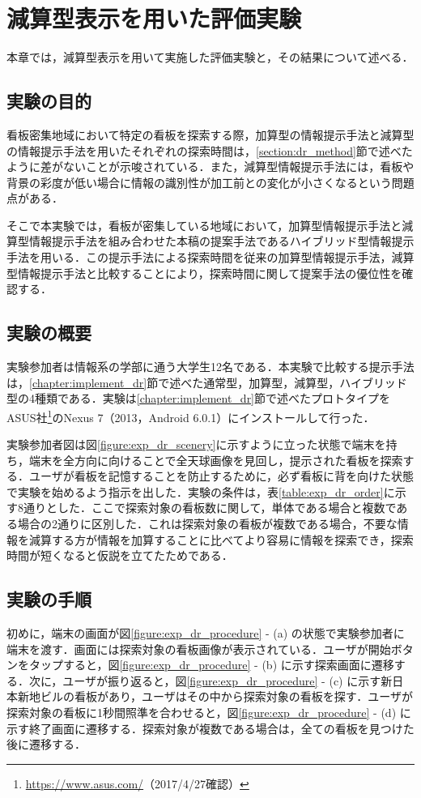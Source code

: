 \chapter{減算型表示を用いた評価実験}
\label{chapter:experiment_dr}
本章では，減算型表示を用いて実施した評価実験と，その結果について述べる．
\section{実験の目的}
  看板密集地域において特定の看板を探索する際，加算型の情報提示手法と減算型の情報提示手法を用いたそれぞれの探索時間は，\ref{section:dr_method}節で述べたように差がないことが示唆されている．また，減算型情報提示手法には，看板や背景の彩度が低い場合に情報の識別性が加工前との変化が小さくなるという問題点がある．

  そこで本実験では，看板が密集している地域において，加算型情報提示手法と減算型情報提示手法を組み合わせた本稿の提案手法であるハイブリッド型情報提示手法を用いる．この提示手法による探索時間を従来の加算型情報提示手法，減算型情報提示手法と比較することにより，探索時間に関して提案手法の優位性を確認する．

\section{実験の概要}
  実験参加者は情報系の学部に通う大学生12名である．本実験で比較する提示手法は，\ref{chapter:implement_dr}節で述べた通常型，加算型，減算型，ハイブリッド型の4種類である．実験は\ref{chapter:implement_dr}節で述べたプロトタイプをASUS社\footnote{\url{https://www.asus.com/}（2017/4/27確認）}のNexus 7（2013，Android 6.0.1）にインストールして行った．

  実験参加者図は図\ref{figure:exp_dr_scenery}に示すように立った状態で端末を持ち，端末を全方向に向けることで全天球画像を見回し，提示された看板を探索する．ユーザが看板を記憶することを防止するために，必ず看板に背を向けた状態で実験を始めるよう指示を出した．実験の条件は，表\ref{table:exp_dr_order}に示す8通りとした．ここで探索対象の看板数に関して，単体である場合と複数である場合の2通りに区別した．これは探索対象の看板が複数である場合，不要な情報を減算する方が情報を加算することに比べてより容易に情報を探索でき，探索時間が短くなると仮説を立てたためである．

\section{実験の手順}
  初めに，端末の画面が図\ref{figure:exp_dr_procedure} - (a) の状態で実験参加者に端末を渡す．画面には探索対象の看板画像が表示されている．ユーザが開始ボタンをタップすると，図\ref{figure:exp_dr_procedure} - (b) に示す探索画面に遷移する．次に，ユーザが振り返ると，図\ref{figure:exp_dr_procedure} - (c) に示す新日本新地ビルの看板があり，ユーザはその中から探索対象の看板を探す．ユーザが探索対象の看板に1秒間照準を合わせると，図\ref{figure:exp_dr_procedure} - (d) に示す終了画面に遷移する．探索対象が複数である場合は，全ての看板を見つけた後に遷移する．

